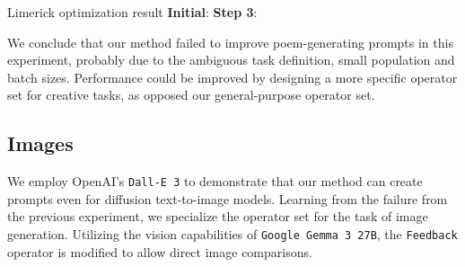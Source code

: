 \begin{promptbox}[label={box:limerickresult}]{Limerick optimization result}
\textbf{Initial}:
\textbf{Step 3}:
\end{promptbox}

We conclude that our method failed to improve poem-generating prompts in this experiment, probably due to the 
ambiguous task definition, small population and batch sizes. Performance could be improved by designing 
a more specific operator set for creative tasks, as opposed our general-purpose operator set.

\subsection{Images}
We employ OpenAI's \texttt{Dall-E 3}\cite{BetkerImprovingIG} to demonstrate that our method can create prompts even for diffusion text-to-image models.
Learning from the failure from the previous experiment, we specialize the operator set for the task of image generation.
Utilizing the vision capabilities of \texttt{Google Gemma 3 27B}, the \texttt{Feedback} operator is modified to allow direct image comparisons. 

